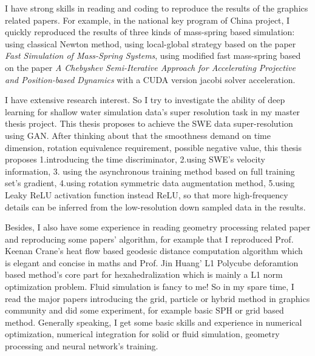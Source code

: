 \documentclass[a4paper,12pt]{article}
\begin{document}
I have strong skills in reading and coding to reproduce the results of the graphics related papers. For example, in the national key program of China project, I quickly reproduced the results of three kinds of mass-spring based simulation: using classical Newton method, using local-global strategy based on the paper \textit{Fast Simulation of Mass-Spring Systems}, using modified fast mass-spring based on the paper \textit{A Chebyshev Semi-Iterative Approach for Accelerating Projective and Position-based Dynamics} with a CUDA version jacobi solver acceleration.\vspace{1.2ex} %

I have extensive research interest. So I try to investigate the ability of deep learning for shallow water simulation data's super resolution task in my master thesis project. This thesis proposes to achieve the SWE data super-resolution using GAN. After thinking about that the smoothness demand on time dimension, rotation equivalence requirement, possible negative value, this thesis proposes 1.introducing the time discriminator, 2.using SWE's velocity information, 3. using the asynchronous training method based on full training set's gradient, 4.using rotation symmetric data augmentation method, 5.using Leaky ReLU activation function instead ReLU, so that more high-frequency details can be inferred from the low-resolution down sampled data in the results.\vspace{1.2ex}  %

Besides, I also have some experience in reading geometry processing related paper and reproducing some papers' algorithm, for example that I reproduced Prof. Keenan Crane's heat flow based geodesic distance computation algorithm which is elegant and concise in maths and Prof. Jin Huang' L1 Polycube deforamtion based method's core part for hexahedralization which is mainly a L1 norm optimization problem. Fluid simulation is fancy to me! So in my spare time, I read the major papers introducing the grid, particle or hybrid method in graphics community and did some experiment, for example basic SPH or grid based method. Generally speaking, I get some basic skills and experience in numerical optimization, numerical integration for solid or fluid simulation, geometry processing and neural network's training.\vspace{1.2ex}
\end{document}
